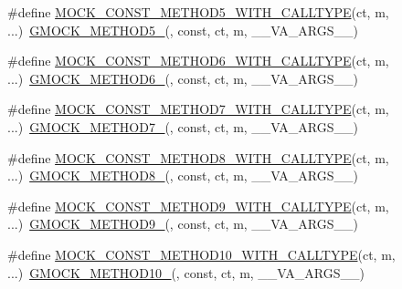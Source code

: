\begin{DoxyCompactItemize}
\item 
\#define \mbox{\hyperlink{gmock-generated-function-mockers_8h_a8d5e56fa6111cd7ee468e6dacf8691b9}{M\+O\+C\+K\+\_\+\+C\+O\+N\+S\+T\+\_\+\+M\+E\+T\+H\+O\+D5\+\_\+\+W\+I\+T\+H\+\_\+\+C\+A\+L\+L\+T\+Y\+PE}}(ct,  m, ...)~\mbox{\hyperlink{gmock-generated-function-mockers_8h_a9e3ecd392499ab19a4a6d3adcabf56f6}{G\+M\+O\+C\+K\+\_\+\+M\+E\+T\+H\+O\+D5\+\_\+}}(, const, ct, m, \+\_\+\+\_\+\+V\+A\+\_\+\+A\+R\+G\+S\+\_\+\+\_\+)
\item 
\#define \mbox{\hyperlink{gmock-generated-function-mockers_8h_a2d904ee47040f643e7b534c22603dd90}{M\+O\+C\+K\+\_\+\+C\+O\+N\+S\+T\+\_\+\+M\+E\+T\+H\+O\+D6\+\_\+\+W\+I\+T\+H\+\_\+\+C\+A\+L\+L\+T\+Y\+PE}}(ct,  m, ...)~\mbox{\hyperlink{gmock-generated-function-mockers_8h_ad0ca7f6973a076d0af4c953f8ed91842}{G\+M\+O\+C\+K\+\_\+\+M\+E\+T\+H\+O\+D6\+\_\+}}(, const, ct, m, \+\_\+\+\_\+\+V\+A\+\_\+\+A\+R\+G\+S\+\_\+\+\_\+)
\item 
\#define \mbox{\hyperlink{gmock-generated-function-mockers_8h_a66076ace4a10740c553080e5273f69c3}{M\+O\+C\+K\+\_\+\+C\+O\+N\+S\+T\+\_\+\+M\+E\+T\+H\+O\+D7\+\_\+\+W\+I\+T\+H\+\_\+\+C\+A\+L\+L\+T\+Y\+PE}}(ct,  m, ...)~\mbox{\hyperlink{gmock-generated-function-mockers_8h_ab98a8399ba62b53b375c2807f4d39d2f}{G\+M\+O\+C\+K\+\_\+\+M\+E\+T\+H\+O\+D7\+\_\+}}(, const, ct, m, \+\_\+\+\_\+\+V\+A\+\_\+\+A\+R\+G\+S\+\_\+\+\_\+)
\item 
\#define \mbox{\hyperlink{gmock-generated-function-mockers_8h_ab66f6bb289f1105f7c0dac3421c4a7f5}{M\+O\+C\+K\+\_\+\+C\+O\+N\+S\+T\+\_\+\+M\+E\+T\+H\+O\+D8\+\_\+\+W\+I\+T\+H\+\_\+\+C\+A\+L\+L\+T\+Y\+PE}}(ct,  m, ...)~\mbox{\hyperlink{gmock-generated-function-mockers_8h_aa84a36427c44505207b7cad5dec7ad67}{G\+M\+O\+C\+K\+\_\+\+M\+E\+T\+H\+O\+D8\+\_\+}}(, const, ct, m, \+\_\+\+\_\+\+V\+A\+\_\+\+A\+R\+G\+S\+\_\+\+\_\+)
\item 
\#define \mbox{\hyperlink{gmock-generated-function-mockers_8h_ad422a4d4cb5e3b91478e66a26c2af63e}{M\+O\+C\+K\+\_\+\+C\+O\+N\+S\+T\+\_\+\+M\+E\+T\+H\+O\+D9\+\_\+\+W\+I\+T\+H\+\_\+\+C\+A\+L\+L\+T\+Y\+PE}}(ct,  m, ...)~\mbox{\hyperlink{gmock-generated-function-mockers_8h_aa820171a19cc587c247dbe05cbffc55f}{G\+M\+O\+C\+K\+\_\+\+M\+E\+T\+H\+O\+D9\+\_\+}}(, const, ct, m, \+\_\+\+\_\+\+V\+A\+\_\+\+A\+R\+G\+S\+\_\+\+\_\+)
\item 
\#define \mbox{\hyperlink{gmock-generated-function-mockers_8h_a484ce7e8fbcc26b5145e893b48e7cd7d}{M\+O\+C\+K\+\_\+\+C\+O\+N\+S\+T\+\_\+\+M\+E\+T\+H\+O\+D10\+\_\+\+W\+I\+T\+H\+\_\+\+C\+A\+L\+L\+T\+Y\+PE}}(ct,  m, ...)~\mbox{\hyperlink{gmock-generated-function-mockers_8h_a81a48223a8771de36ef92ac6d56f6e81}{G\+M\+O\+C\+K\+\_\+\+M\+E\+T\+H\+O\+D10\+\_\+}}(, const, ct, m, \+\_\+\+\_\+\+V\+A\+\_\+\+A\+R\+G\+S\+\_\+\+\_\+)

\end{DoxyCompactItemize}
